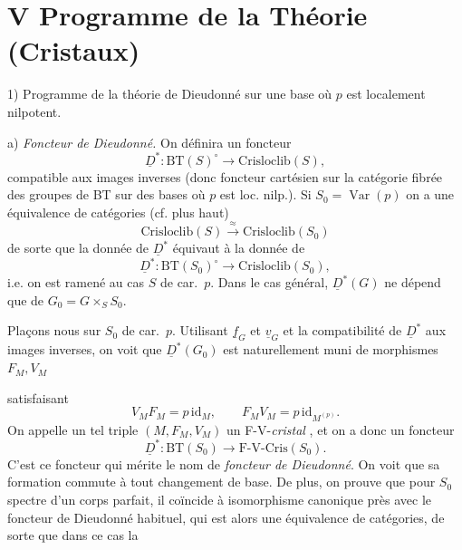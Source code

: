 \documentclass[11pt,a4paper]{article}
\begin{document}
\section{V Programme de la Théorie (Cristaux)}

1) Programme de la théorie de Dieudonné sur une base  où $p$ est localement nilpotent.

a) \emph{Foncteur de Dieudonné.} On  définira un foncteur
\[
  \underline{D}^{*} : \mathrm{BT}(S)^{\circ} \longrightarrow \mathrm{Crisloclib}(S),
\]
compatible aux images inverses (donc foncteur cartésien sur la catégorie fibrée des groupes de BT sur des bases où $p$ est loc. nilp.). Si $S_{0} = \operatorname{Var}(p)$ on a une équivalence de catégories (cf. \quad plus haut)
\[
  \mathrm{Crisloclib}(S) \xrightarrow{\ \approx\ } \mathrm{Crisloclib}(S_{0})
\]
de sorte que la donnée de $\underline{D}^{*}$ équivaut à la donnée de
\[
  \underline{D}^{*} : \mathrm{BT}(S_{0})^{\circ} \longrightarrow \mathrm{Crisloclib}(S_{0}),
\]
i.e. on est ramené  au cas $S$ de car.~$p$.  Dans le cas général, $\underline{D}^{*}(G)$ ne dépend que de \struck{\ill{}} $G_{0} = G \times_{S} S_{0}$.

\struck{\ill{}} Plaçons nous sur $S_{0}$ de car.~$p$. Utilisant $\underline{f}_{G}$ et $\underline{v}_{G}$ et la compatibilité de $\underline{D}^{*}$ aux images inverses, on voit que  $\underline{D}^{*}(G_{0})$   est naturellement muni de morphismes $F_{M}, V_{M}$ 



satisfaisant
\[
  V_{M} F_{M} = p\, \mathrm{id}_{M}, \qquad F_{M} V_{M} = p\, \mathrm{id}_{M^{(p)}} .
\]
On appelle un tel triple $(M, F_{M}, V_{M})$ un F-V-\emph{cristal} , et on a donc un foncteur
\[
  \underline{D}^{*} : \mathrm{BT}(S_{0}) \longrightarrow \text{F-V-Cris}(S_{0}) .
\]
C'est ce foncteur qui mérite le nom de \emph{foncteur de Dieudonné}. On \struck{\ill{}} voit que sa formation commute à tout changement de base. De plus, on prouve que pour $S_{0}$ spectre d'un corps parfait, il coïncide  à isomorphisme canonique près avec le foncteur de Dieudonné habituel, qui est alors une équivalence de catégories, de sorte que dans ce cas la
\end{document}
